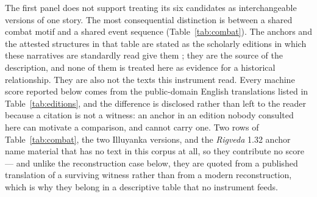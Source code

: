 \documentclass[11pt]{article}
\DeclareRobustCommand{\_}{\textunderscore\allowbreak}
\begin{document}
The first panel does not support treating its six candidates as interchangeable
versions of one story. The most consequential distinction is between a shared
combat motif and a shared event sequence (Table~\ref{tab:combat}). The anchors and the
attested structures in that table are stated as the scholarly editions in which these
narratives are standardly read give them
\citep{jamison2014,hoffner1998,west1966,lambert2013,larrington2014,faulkes1987}; they are
the source of the description, and none of them is treated here as evidence for a
historical relationship. They are also not the texts this instrument read. Every machine
score reported below comes from the public-domain English translations listed in
Table~\ref{tab:editions}, and the difference is disclosed rather than left to the reader
because a citation is not a witness: an anchor in an edition nobody consulted here can
motivate a comparison, and cannot carry one. Two rows of Table~\ref{tab:combat}, the two
Illuyanka versions, and the \emph{Rigveda} 1.32 anchor name material that has no text in
this corpus at all, so they contribute no score --- and unlike the reconstruction case
below, they are quoted from a published translation of a surviving witness rather than
from a modern reconstruction, which is why they belong in a descriptive table that no
instrument feeds.
\end{document}
